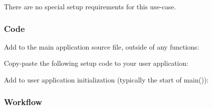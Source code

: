 There are no special setup requirements for this use-\/case.\hypertarget{asfdoc_sam0_sercom_usart_basic_use_case_asfdoc_sam0_usart_basic_use_case_setup_code}{}\subsubsection{Code}\label{asfdoc_sam0_sercom_usart_basic_use_case_asfdoc_sam0_usart_basic_use_case_setup_code}
Add to the main application source file, outside of any functions\+: 
\begin{DoxyCodeInclude}
\end{DoxyCodeInclude}
 Copy-\/paste the following setup code to your user application\+: 
\begin{DoxyCodeInclude}
\end{DoxyCodeInclude}
 Add to user application initialization (typically the start of {\ttfamily main()})\+: 
\begin{DoxyCodeInclude}
\end{DoxyCodeInclude}
 \hypertarget{asfdoc_sam0_sercom_usart_basic_use_case_asfdoc_sam0_usart_basic_use_case_setup_flow}{}\subsubsection{Workflow}\label{asfdoc_sam0_sercom_usart_basic_use_case_asfdoc_sam0_usart_basic_use_case_setup_flow}

